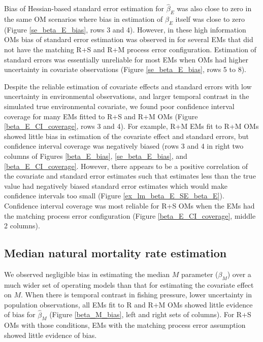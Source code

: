 \documentclass[
  12pt,
]{article}
\begin{document}
Bias of Hessian-based standard error estimation for \(\widehat \beta_E\) was also close to zero in the same OM scenarios where bias in estimation of \(\beta_E\) itself was close to zero (Figure \ref{se_beta_E_bias}, rows 3 and 4). However, in these high information OMs bias of standard error estimation was observed in for several EMs that did not have the matching R+S and R+M process error configuration. Estimation of standard errors was essentially unreliable for most EMs when OMs had higher uncertainty in covariate observations (Figure \ref{se_beta_E_bias}, rows 5 to 8).

Despite the reliable estimation of covariate effects and standard errors with low uncertainty in environmental observations, and larger temporal contrast in the simulated true environmental covariate, we found poor confidence interval coverage for many EMs fitted to R+S and R+M OMs (Figure \ref{beta_E_CI_coverage}, rows 3 and 4). For example, R+M EMs fit to R+M OMs showed little bias in estimation of the covariate effect and standard errors, but confidence interval coverage was negatively biased (rows 3 and 4 in right two columns of Figures \ref{beta_E_bias}, \ref{se_beta_E_bias}, and \ref{beta_E_CI_coverage}. However, there appears to be a positive correlation of the covariate and standard error estimates such that estimates less than the true value had negatively biased standard error estimates which would make confidence intervals too small (Figure \ref{ex_lm_beta_E_SE_beta_E}). Confidence interval coverage was most reliable for R+S OMs when the EMs had the matching process error configuration (Figure \ref{beta_E_CI_coverage}, middle 2 columns).

\hypertarget{median-natural-mortality-rate-estimation}{%
\subsection*{Median natural mortality rate estimation}\label{median-natural-mortality-rate-estimation}}

We observed negligible bias in estimating the median \(M\) parameter (\(\beta_M\)) over a much wider set of operating models than that for estimating the covariate effect on \(M\). When there is temporal contrast in fishing pressure, lower uncertainty in population observations, all EMs fit to R and R+M OMs showed little evidence of bias for \(\widehat \beta_M\) (Figure \ref{beta_M_bias}, left and right sets of columns). For R+S OMs with those conditions, EMs with the matching process error assumption showed little evidence of bias.
\end{document}
